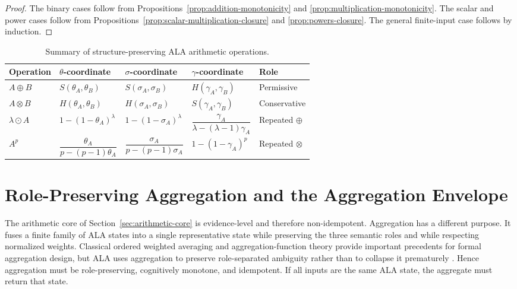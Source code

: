 \documentclass[reqno,final]{amsart}
\theoremstyle{definition}
\theoremstyle{plain}
\theoremstyle{remark}
\begin{document}
\begin{proof}
The binary cases follow from Propositions~\ref{prop:addition-monotonicity} and \ref{prop:multiplication-monotonicity}. The scalar and power cases follow from Propositions~\ref{prop:scalar-multiplication-closure} and \ref{prop:powers-closure}. The general finite-input case follows by induction.
\end{proof}

\begin{table}[!htbp]
\centering
\caption{Summary of structure-preserving ALA arithmetic operations.}
\label{tab:ala-arithmetic-summary}
\fontsize{10}{12}\selectfont
\setlength{\tabcolsep}{2pt}
\renewcommand{\arraystretch}{1.15}
\begin{tabularx}{\textwidth}{>{\raggedright\arraybackslash}p{0.62in}>{\raggedright\arraybackslash}X>{\raggedright\arraybackslash}X>{\raggedright\arraybackslash}X>{\raggedright\arraybackslash}p{0.72in}}
\toprule
Operation & \(\theta\)-coordinate & \(\sigma\)-coordinate & \(\gamma\)-coordinate & Role \\
\midrule
\(A\oplus B\) & \(S(\theta_A,\theta_B)\) & \(S(\sigma_A,\sigma_B)\) & \(H(\gamma_A,\gamma_B)\) & Permissive \\
\(A\otimes B\) & \(H(\theta_A,\theta_B)\) & \(H(\sigma_A,\sigma_B)\) & \(S(\gamma_A,\gamma_B)\) & Conservative \\
\(\lambda\odot A\) & \(1-(1-\theta_A)^\lambda\) & \(1-(1-\sigma_A)^\lambda\) & \(\dfrac{\gamma_A}{\lambda-(\lambda-1)\gamma_A}\) & Repeated \(\oplus\) \\
\(A^p\) & \(\dfrac{\theta_A}{p-(p-1)\theta_A}\) & \(\dfrac{\sigma_A}{p-(p-1)\sigma_A}\) & \(1-(1-\gamma_A)^p\) & Repeated \(\otimes\) \\

\bottomrule
\end{tabularx}
\end{table}

\section{Role-Preserving Aggregation and the Aggregation Envelope}
\label{sec:aggregation}

The arithmetic core of Section~\ref{sec:arithmetic-core} is evidence-level and therefore non-idempotent. Aggregation has a different purpose. It fuses a finite family of ALA states into a single representative state while preserving the three semantic roles and while respecting normalized weights. Classical ordered weighted averaging and aggregation-function theory provide important precedents for formal aggregation design, but ALA uses aggregation to preserve role-separated ambiguity rather than to collapse it prematurely \cite{Yager1988,BeliakovPraderaCalvo2007}. Hence aggregation must be role-preserving, cognitively monotone, and idempotent. If all inputs are the same ALA state, the aggregate must return that state.
\end{document}
